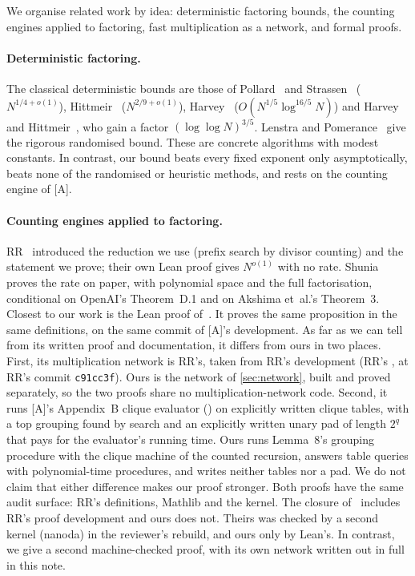 \documentclass[10pt]{amsart}
\theoremstyle{plain}
\theoremstyle{definition}
\theoremstyle{remark}
\numberwithin{equation}{section}
\newcommand{\A}{\textup{[A]}}
\begin{document}
We organise related work by idea: deterministic factoring bounds, the counting engines applied to
factoring, fast multiplication as a network, and formal proofs.

\paragraph{Deterministic factoring.} The classical deterministic bounds are those of
Pollard~\cite{Pol74} and Strassen~\cite{Str77} ($N^{1/4+o(1)}$), Hittmeir~\cite{Hit21}
($N^{2/9+o(1)}$), Harvey~\cite{Har21} ($O(N^{1/5}\log^{16/5}N)$) and Harvey and
Hittmeir~\cite{HH22}, who gain a factor $(\log\log N)^{3/5}$. Lenstra and Pomerance~\cite{LP92} give
the rigorous randomised bound. These are concrete algorithms with modest constants. In contrast, our
bound beats every fixed exponent only asymptotically, beats none of the randomised or heuristic methods,
and rests on the counting engine of \A.

\paragraph{Counting engines applied to factoring.} RR~\cite{RR26} introduced the reduction we use
(prefix search by divisor counting) and the statement we prove; their own Lean proof gives $N^{o(1)}$
with no rate. Shunia~\cite{Shu26} proves the rate on paper, with polynomial space and the full
factorisation, conditional on OpenAI's Theorem~D.1 and on Akshima et~al.'s Theorem~3. Closest to our
work is the Lean proof of~\cite{IF26}. It proves the same proposition in the same definitions, on the
same commit of \A's development. As far as we can tell from its written proof and documentation, it
differs from ours in two places. First, its multiplication network is RR's, taken from RR's development
(RR's , at RR's commit \texttt{c91cc3f}). Ours is the network of \cref{sec:network},
built and proved separately, so the two proofs share no multiplication-network code. Second, it runs
\A's Appendix~B clique evaluator () on explicitly written clique
tables, with a top grouping found by search and an explicitly written unary pad of length $2^q$ that pays
for the evaluator's running time. Ours runs Lemma~8's grouping procedure with the clique machine of the
counted recursion, answers table queries with polynomial-time procedures, and writes neither tables nor
a pad. We do not claim that either difference makes our proof stronger. Both proofs have the same audit
surface: RR's definitions, Mathlib and the kernel. The closure of~\cite{IF26} includes RR's proof
development and ours does not. Theirs was checked by a second kernel (nanoda) in the reviewer's rebuild,
and ours only by Lean's. In contrast, we give a second machine-checked proof, with its own
network written out in full in this note.
\end{document}
